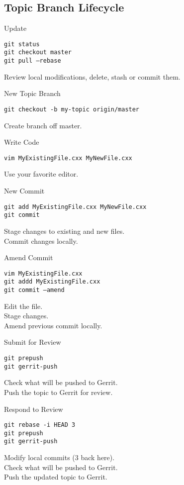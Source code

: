 \documentclass[10pt]{article}
\newlength{\cvsep}
\newlength{\cvtitles}
\newlength{\cvmain}
\newenvironment{category}[1]
  {\parbox[t]{\cvtitles}{\large\sc\centering #1}\hspace*{\cvsep}\begin{minipage}[t]{\cvmain}}
  {\end{minipage}\vspace*{0.35cm}}
\begin{document}
\subsection*{Topic Branch Lifecycle}
\begin{category}{Update}
\parbox[t]{0.6\cvmain}{%
  \texttt{git status\\ git checkout master\\ git pull --rebase}
}
\parbox[t]{0.38\cvmain}{%
Review local modifications, delete, stash or commit them.
}
\end{category}
\begin{category}{New Topic Branch}
\parbox[t]{0.6\cvmain}{%
  \texttt{git checkout -b my-topic origin/master}
}
\parbox[t]{0.38\cvmain}{%
Create branch off master.
}
\end{category}
\begin{category}{Write Code}
\parbox[t]{0.6\cvmain}{%
  \texttt{vim MyExistingFile.cxx MyNewFile.cxx}
}
\parbox[t]{0.38\cvmain}{%
Use your favorite editor.
}
\end{category}
\begin{category}{New Commit}
\parbox[t]{0.6\cvmain}{%
  \texttt{git add MyExistingFile.cxx MyNewFile.cxx\\
  git commit}
}
\parbox[t]{0.38\cvmain}{%
Stage changes to existing and new files.\\
Commit changes locally.
}
\end{category}
\begin{category}{Amend Commit}
\parbox[t]{0.6\cvmain}{%
  \texttt{vim MyExistingFile.cxx\\
  git addd MyExistingFile.cxx\\
  git commit --amend}
}
\parbox[t]{0.38\cvmain}{%
Edit the file.\\
Stage changes.\\
Amend previous commit locally.
}
\end{category}
\begin{category}{Submit for Review}
\parbox[t]{0.6\cvmain}{%
  \texttt{git prepush\\ git gerrit-push}
}
\parbox[t]{0.38\cvmain}{%
Check what will be pushed to Gerrit.\\
Push the topic to Gerrit for review.
}
\end{category}
\begin{category}{Respond to Review}
\parbox[t]{0.6\cvmain}{%
  \texttt{git rebase -i HEAD~3\\ git prepush\\ git gerrit-push}
}
\parbox[t]{0.38\cvmain}{%
Modify local commits (3 back here).\\
Check what will be pushed to Gerrit.\\
Push the updated topic to Gerrit.
}
\end{category}
\end{document}
